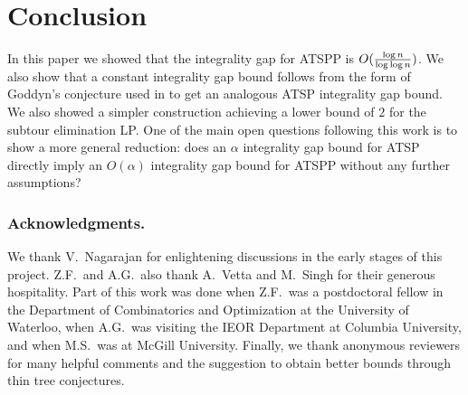 \documentclass[11pt]{article}
\theoremstyle{definition}
\newcommand{\factor}{\ensuremath{O(\smash{\frac{\log n}{\log\log n}})}}
\begin{document}
\section{Conclusion}



In this paper we showed that the integrality gap for ATSPP is $\factor$.
We also show that a constant integrality gap bound follows
from the form of Goddyn's conjecture used in \cite{GS11}
to get an analogous ATSP integrality gap bound.
We also showed a simpler construction achieving a lower
bound of $2$ for the subtour elimination LP.
One of the main open questions following this work is to
show a more general reduction: does an $\alpha$ integrality
gap bound for ATSP directly imply an $O(\alpha)$ integrality gap bound
for ATSPP without any further assumptions?

















\subsubsection*{Acknowledgments.} We thank V.~Nagarajan for enlightening
discussions in the early stages of this project. Z.F.\ and A.G.\ also
thank A.~Vetta and M.~Singh for their generous hospitality. Part of this work was done when
Z.F.\ was a postdoctoral fellow in the Department of Combinatorics and Optimization at the University of
Waterloo, when A.G.\ was visiting the IEOR Department at Columbia
University, and  when M.S.\ was at McGill University.
Finally, we thank anonymous reviewers for many helpful comments and the suggestion to obtain better bounds through thin tree conjectures.


{\small }
\end{document}
